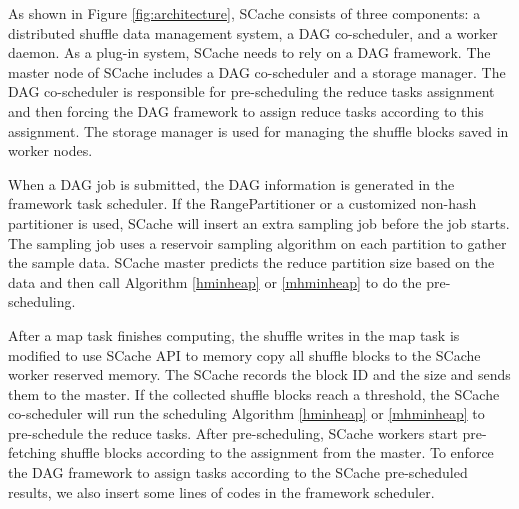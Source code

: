 {\color{black}
As shown in Figure \ref{fig:architecture}, SCache consists of three components: a distributed shuffle data management system, a DAG co-scheduler, and a worker daemon.
As a plug-in system, SCache needs to rely on a DAG framework. 
The master node of SCache includes a DAG co-scheduler and a storage manager.
The DAG co-scheduler is responsible for pre-scheduling the reduce tasks assignment and then forcing the DAG framework to assign reduce tasks according to this assignment.
The storage manager is used for managing the shuffle blocks saved in worker nodes.

When a DAG job is submitted, the DAG information is generated in the framework task scheduler. 
If the RangePartitioner or a customized non-hash partitioner is used, SCache will insert an extra sampling job before the job starts.
The sampling job uses a reservoir sampling algorithm \cite{reservoir} on each partition to gather the sample data.
SCache master predicts the reduce partition size based on the data and then call Algorithm \ref{hminheap} or \ref{mhminheap} to do the pre-scheduling.

After a map task finishes computing, the shuffle writes in the map task is modified to use SCache API to memory copy all shuffle blocks to the SCache worker reserved memory.
The SCache records the block ID and the size and sends them to the master.
If the collected shuffle blocks reach a threshold, the SCache co-scheduler will run the scheduling Algorithm \ref{hminheap} or \ref{mhminheap} to pre-schedule the reduce tasks.
After pre-scheduling, SCache workers start pre-fetching shuffle blocks according to the assignment from the master.
To enforce the DAG framework to assign tasks according to the SCache pre-scheduled results, we also insert some lines of codes in the framework scheduler.
}
